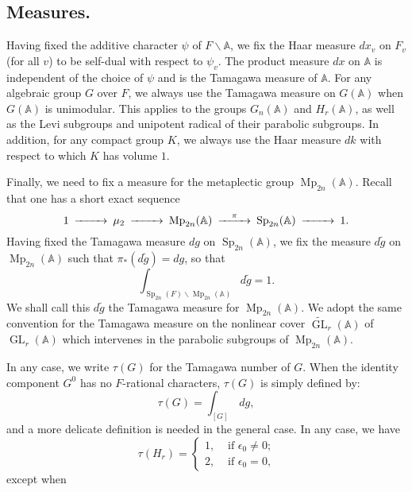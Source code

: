 \documentclass[10pt]{amsart}
\theoremstyle{plain}
\numberwithin{equation}{section}
\begin{document}
 
\subsection{\bf Measures.}
Having fixed the additive character $\psi$ of  $F \backslash {\mathbb{A}}$,
 we fix the Haar measure $dx_v$ on $F_v$ (for all $v$) to be self-dual
 with respect to $\psi_v$. The product measure $dx$ on ${\mathbb{A}}$ is independent of the choice of 
 $\psi$ and is the Tamagawa measure of ${\mathbb{A}}$. 
 For any  algebraic group $G$ over $F$, we
 always use the Tamagawa measure on $G({\mathbb{A}})$ when $G({\mathbb{A}})$ is unimodular. This applies to
 the groups $G_n({\mathbb{A}})$ and $H_r({\mathbb{A}})$, as well as the Levi subgroups and unipotent radical of their parabolic subgroups. 
In addition, for any compact group $K$, we
 always use the Haar measure $dk$ with respect to which $K$ has volume
 $1$. 
 
\vskip 5pt

Finally, we need to fix a measure for the metaplectic group
${\operatorname{Mp}}_{2n}({\mathbb{A}})$. Recall that one has a short exact sequence
 \[  \begin{CD}
 1 @>>> \mu_2 @>>> {\operatorname{Mp}}_{2n}({\mathbb{A}}) @>\pi>> {\operatorname{Sp}}_{2n}({\mathbb{A}})@>>>1. \end{CD} \]
 Having fixed the Tamagawa measure $dg$ on ${\operatorname{Sp}}_{2n}({\mathbb{A}})$, we fix the
 measure $d \tilde{g}$ on ${\operatorname{Mp}}_{2n}({\mathbb{A}})$ such that $ \pi_*(d
 \tilde{g}) =  dg$, so that
 \[  \int_{{\operatorname{Sp}}_{2n}(F) \backslash {\operatorname{Mp}}_{2n}({\mathbb{A}})} d \tilde{g}  =1. \]
We shall call this $d\tilde{g}$ the Tamagawa measure for ${\operatorname{Mp}}_{2n}({\mathbb{A}})$. 
We adopt the same convention for the Tamagawa measure on the nonlinear cover $\tilde{\operatorname{GL}}_r({\mathbb{A}})$ of 
${\operatorname{GL}}_r({\mathbb{A}})$ which intervenes in the parabolic subgroups of ${\operatorname{Mp}}_{2n}({\mathbb{A}})$. 
\vskip 5pt

 In any case, we write $\tau(G)$ for the Tamagawa number of $G$. When the identity component  
 $G^0$ has no $F$-rational characters, $\tau(G)$ is simply defined by:
 \[  \tau(G) = \int_{[G]} \, dg, \]
 and a more delicate definition is needed in the general case.
 In any case, we have
 \[  \tau(H_r)  = \begin{cases}
 1, &\text{ if $\epsilon_0 \ne 0$;} \\
 2, &\text{  if $\epsilon_0 = 0$,} \end{cases} \]
 except when
 \vskip 5pt
 
\end{document}

